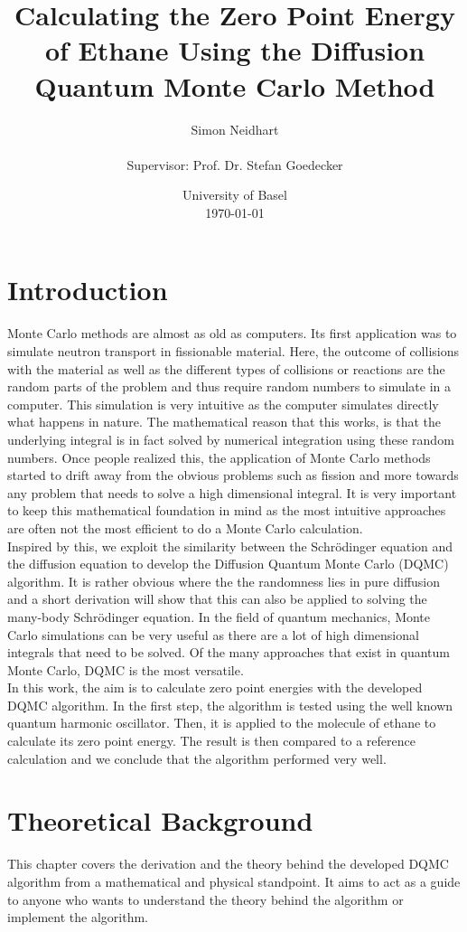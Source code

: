 \documentclass [12pt]{report}
\title{Calculating the Zero Point Energy of Ethane Using the Diffusion Quantum Monte Carlo Method}
\author{Simon Neidhart \\ \\ Supervisor: Prof. Dr. Stefan Goedecker}
\date{University of Basel \\ \today}
\begin{document}
\maketitle
\tableofcontents
\newpage
\chapter{Introduction}
Monte Carlo methods are almost as old as computers. Its first application was to simulate neutron transport in fissionable material. Here, the outcome of collisions with the material as well as the different types of collisions or reactions are the random parts of the problem and thus require random numbers to simulate in a computer. This simulation is very intuitive as the computer simulates directly what happens in nature. The mathematical reason that this works, is that the underlying integral is in fact solved by numerical integration using these random numbers. Once people realized this, the application of Monte Carlo methods started to drift away from the obvious problems such as fission and more towards any problem that needs to solve a high dimensional integral. It is very important to keep this mathematical foundation in mind as the most intuitive approaches are often not the most efficient to do a Monte Carlo calculation.\\
Inspired by this, we exploit the similarity between the Schrödinger equation and the diffusion equation to develop the Diffusion Quantum Monte Carlo (DQMC) algorithm. It is rather obvious where the the randomness lies in pure diffusion and a short derivation will show that this can also be applied to solving the many-body Schrödinger equation. In the field of quantum mechanics, Monte Carlo simulations can be very useful as there are a lot of high dimensional integrals that need to be solved. Of the many approaches that exist in quantum Monte Carlo, DQMC is the most versatile.\\
In this work, the aim is to calculate zero point energies with the developed DQMC algorithm. In the first step, the algorithm is tested using the well known quantum harmonic oscillator. Then, it is applied to the molecule of ethane to calculate its zero point energy. The result is then compared to a reference calculation and we conclude that the algorithm performed very well.

\chapter{Theoretical Background}
This chapter covers the derivation and the theory behind the developed DQMC algorithm from a mathematical and physical standpoint. It aims to act as a guide to anyone who wants to understand the theory behind the algorithm or implement the algorithm.
\end{document}
